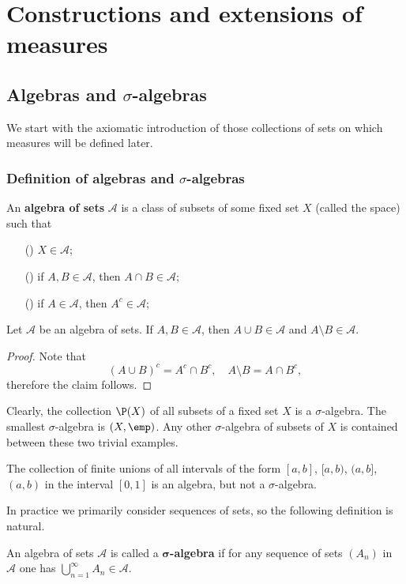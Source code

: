 \chapter{Constructions and extensions of measures}
\section{Algebras and \boldmath\texorpdfstring{$\sigma$}{sigma}-algebras}
We start with the axiomatic introduction of those collections of sets on which measures will be defined later.
\subsection{Definition of algebras and \boldmath\texorpdfstring{$\sigma$}{sigma}-algebras}
\begin{definition}
An \textbf{algebra of sets} $\mathcal{A}$ is a class of subsets of some fixed set $X$ (called the space) such that
\begin{itemize}
\item[(\rmnum{1})] $X\in\mathcal{A}$;
\item[(\rmnum{2})] if $A,B\in\mathcal{A}$, then $A\cap B\in\mathcal{A}$;
\item[(\rmnum{3})] if $A\in\mathcal{A}$, then $A^c\in\mathcal{A}$;
\end{itemize}
\end{definition}
\begin{proposition}
Let $\mathcal{A}$ be an algebra of sets. If $A,B\in\mathcal{A}$, then $A\cup B\in\mathcal{A}$ and $A\setminus B\in\mathcal{A}$.
\end{proposition}
\begin{proof}
Note that
\[(A\cup B)^c=A^c\cap B^c,\quad A\setminus B=A\cap B^c,\]
therefore the claim follows.
\end{proof}
\begin{example}
Clearly, the collection $\P(X)$ of all subsets of a fixed set $X$ is a $\sigma$-algebra. The smallest $\sigma$-algebra is $(X,\emp)$. Any other $\sigma$-algebra of subsets of $X$ is contained between these two trivial examples.
\end{example}
\begin{example}
The collection of finite unions of all intervals of the form $[a,b]$, $[a,b)$, $(a,b]$, $(a,b)$ in the interval $[0,1]$ is an algebra, but not a $\sigma$-algebra.
\end{example}
In practice we primarily consider sequences of sets, so the following definition is natural.
\begin{definition}
An algebra of sets $\mathcal{A}$ is called a \textbf{$\bm{\sigma}$-algebra} if for any sequence of sets $(A_n)$ in $\mathcal{A}$ one has 
$\bigcup_{n=1}^{\infty}A_n\in\mathcal{A}$.
\end{definition}
